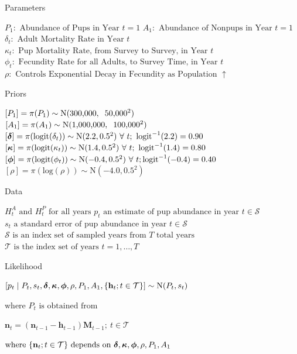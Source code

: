 \documentclass[mathserif,compress]{beamer}
\def\bh{\mathbf{h}}
\def\bn{\mathbf{n}}
\def\bM{\mathbf{M}}
\def\bdelta{\mbox{\boldmath $\delta$}}
\def\bphi{\mbox{\boldmath $\phi$}}
\def\bkappa{\mbox{\boldmath $\kappa$}}
\begin{document}
\begin{frame} 
Parameters

$P_{1}:\textrm{ Abundance of Pups in Year }t = 1$
$A_{1}:\textrm{ Abundance of Nonpups in Year }t = 1$
$\delta_{t}:\textrm{ Adult Mortality Rate in Year }t$
$\kappa_{t}:\textrm{ Pup Mortality Rate, from Survey to Survey, in Year }t$
$\phi_{t}:\textrm{ Fecundity Rate for all Adults, to Survey Time, in Year }t$
$\rho:\textrm{ Controls Exponential Decay in Fecundity as Population }\uparrow$

Priors

$[P_{1}] = \pi(P_{1}) \sim \textrm{N}(\textrm{300,000}, \hspace{.2cm} \textrm{50,000}^{2})$ \\
$[A_{1}] = \pi(A_{1}) \sim \textrm{N}(\textrm{1,000,000}, \hspace{.2cm} \textrm{100,000}^{2})$
$[\bdelta] = \pi(\textrm{logit}(\delta_{t})) \sim \textrm{N}(2.2, 0.5^{2}) \ \forall \ t; \ \textrm{logit}^{-1}(2.2) = 0.90$
$[\bkappa] = \pi(\textrm{logit}(\kappa_{t})) \sim \textrm{N}(1.4, 0.5^{2}) \ \forall \ t; \ \textrm{logit}^{-1}(1.4) = 0.80$
$[\bphi] = \pi(\textrm{logit}(\phi_{t})) \sim \textrm{N}(-0.4, 0.5^{2}) \ \forall \ t; \textrm{logit}^{-1}(-0.4) = 0.40$
$[\rho] = \pi(\textrm{log}(\rho)) \sim \textrm{N}(-4.0, 0.5^{2})$ \\


\end{frame}

\begin{frame} 
Data

\vspace{.2cm}
$H^{A}_t \textrm{ and } H^{P}_t \textrm{ for all years}$
$p_{t} \textrm{ an estimate of pup abundance in year }t \in \mathcal{S}$
$s_{t} \textrm{ a standard error of pup abundance in year }t \in \mathcal{S}$
$\mathcal{S} \textrm{ is an index set of sampled years from }T\textrm{ total years}$
$\mathcal{T} \textrm{ is the index set of years } t = 1,\ldots,T$
\vspace{.2cm}

Likelihood
\begin{center}
$[p_{t} \mid P_{t}, s_{t},\bdelta,\bkappa,\bphi,\rho,P_{1},A_{1},\{\bh_{t}; t \in \mathcal{T}\}] \sim \textrm{N}(P_{t},s_{t})$ \\
\end{center}
$\textrm{where } P_{t} \textrm{ is obtained from}$
\begin{center}
$\bn_{t} = \left(\bn_{t-1} - \bh_{t-1}\right) \bM_{t-1}; \ t \in \mathcal{T}$
\end{center}
$\textrm{where }\{\bn_{t}; t \in \mathcal{T}\}\textrm{ depends on }\bdelta,\bkappa,\bphi,\rho,P_{1},A_{1}$


\end{frame}
\end{document}

